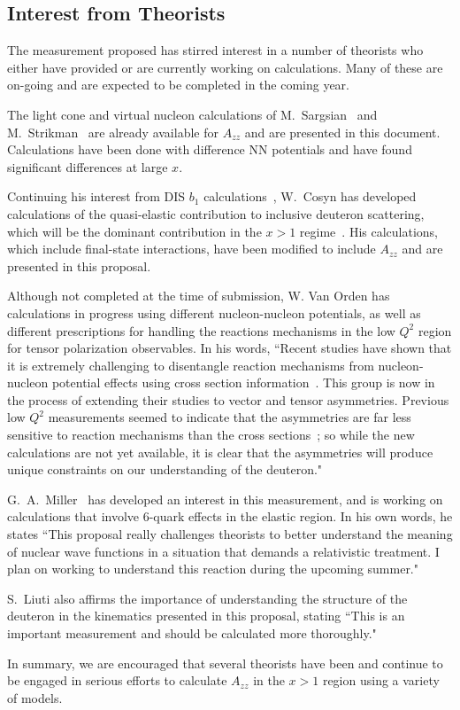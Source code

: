 \subsection{Interest from Theorists}

The measurement proposed has stirred interest in a number of theorists who either have provided or are currently working on calculations. Many of these are on-going and are expected to be completed in the coming year.

The light cone and virtual nucleon calculations of M.~Sargsian~\cite{misak-convo} and M.~Strikman~\cite{strikman-convo} are already available for $A_{zz}$ and are presented in this document. Calculations have been done with difference NN potentials and have found significant differences at large $x$.

Continuing his interest from DIS $b_1$ calculations~\cite{Cosyn:2014sqa}, W.~Cosyn has developed calculations of the quasi-elastic contribution to inclusive deuteron scattering, which will be the dominant contribution in the $x>1$ regime~\cite{cosyn-convo}. His calculations, which include final-state interactions, have been modified to include $A_{zz}$ and are presented in this proposal.

Although not completed at the time of submission, W. Van Orden has calculations in progress using different nucleon-nucleon potentials, as well as different prescriptions for handling the reactions mechanisms in the low $Q^2$ region for tensor polarization observables. In his words, ``Recent studies have shown that it is extremely challenging to disentangle reaction mechanisms from nucleon-nucleon potential effects using cross section information~\cite{Ford:2014yua}. This group is now in the process of extending their studies to vector and tensor asymmetries. Previous low $Q^2$ measurements seemed to indicate that the asymmetries are far less sensitive to reaction 
mechanisms than the cross sections~\cite{Passchier:2001uc}; so while the 
new calculations are not yet available, it is clear that the asymmetries will produce unique constraints 
on our understanding of the deuteron."~\cite{vanorden-convo}

G.~A.~Miller~\cite{miller-convo} has developed an interest in this measurement, and is working on calculations that involve 6-quark effects in the elastic region. In his own words, he states ``This proposal really challenges theorists to better understand the meaning of nuclear wave functions in a situation that demands a relativistic treatment. I plan on working to understand this reaction during the upcoming summer."

S.~Liuti also affirms the importance of understanding the structure of the deuteron in the kinematics presented in this proposal, stating ``This is an important measurement and should be calculated more thoroughly."~\cite{liuti-convo}



In summary, we are encouraged that several theorists have been and continue to be engaged in serious efforts to calculate $A_{zz}$ in the $x>1$ region using a variety of models.
